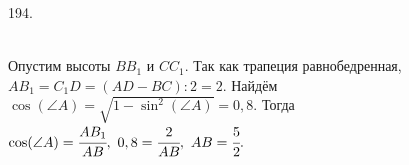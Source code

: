 194. \begin{figure}[ht!]
\end{figure}\\
Опустим высоты $BB_1$ и $CC_1.$ Так как трапеция равнобедренная, $AB_1=C_1D=(AD-BC):2=2.$ Найдём $\cos(\angle A)=\sqrt{1-\sin^2(\angle A)}=0,8.$ Тогда
$\cos(\angle A)=\cfrac{AB_1}{AB},\ 0,8=\cfrac{2}{AB},\ AB=\cfrac{5}{2}.$\\
